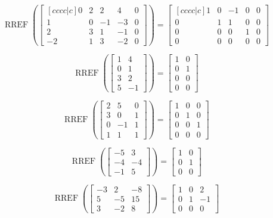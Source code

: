 \documentclass{article}
\DeclareMathOperator{\RREF}{RREF}
\begin{document}
\[\RREF\left( \begin{bmatrix}[cccc|c]
0 & 2 & 2 & 4 &0  \\
1 & 0 & -1 & -3 & 0 \\
2 & 3 & 1 & -1 & 0\\
-2 & 1 & 3 & -2 & 0
\end{bmatrix} \right) 
= \begin{bmatrix}[cccc|c] 
1 & 0 & -1 & 0 &0  \\
0 & 1 & 1 & 0 & 0 \\
0 & 0 & 0 & 1 & 0\\
0 & 0 & 0 & 0 & 0
\end{bmatrix}
\] 


\[
\RREF\left(\begin{bmatrix}
 1 & 4 \\ 0 &1 \\3 &2 \\ 5 &-1
\end{bmatrix}\right)
=
\begin{bmatrix}
 1 & 0 \\ 0 & 1 \\0 & 0 \\ 0 & 0
\end{bmatrix}
\]


\[
  \RREF \left( \begin{bmatrix}
    2 & 5 & 0 \\
    3 & 0 & 1 \\
    0 & -1 & 1 \\
    1 & 1 & 1
  \end{bmatrix} \right) = \begin{bmatrix}
    1 & 0 & 0 \\
    0 & 1 & 0 \\
    0 & 0 & 1 \\
    0 & 0 & 0
  \end{bmatrix}
\]


\[
\RREF \left( \begin{bmatrix} -5 & 3 \\ -4 & -4 \\ -1 & 5 \end{bmatrix} \right) 
= \begin{bmatrix} 1 & 0 \\ 0 & 1 \\ 0 & 0 \end{bmatrix}
\]

\[
\RREF\left( \begin{bmatrix} -3 &  2 & -8 \\ 5 & -5 & 15 \\ 3 & -2 & 8 \end{bmatrix} \right)
= \begin{bmatrix} 1 &  0 & 2 \\ 0  & 1 & -1\\ 0 & 0 & 0  \end{bmatrix}
\]
\end{document}
